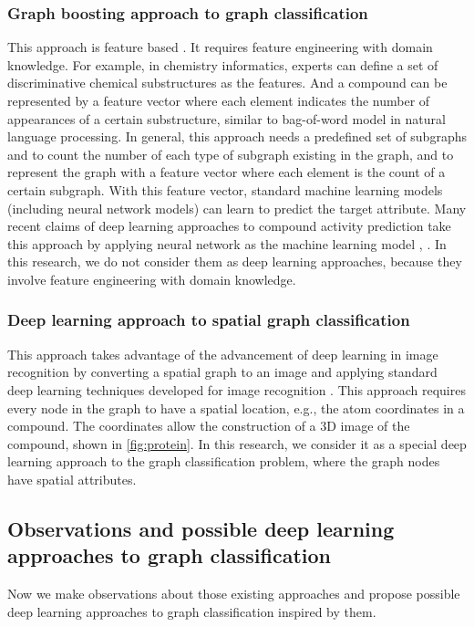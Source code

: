 \documentclass{article}
\begin{document}
\subsubsection{Graph boosting approach to graph classification}
This approach is feature based \cite{saigo2009gboost}.
It requires feature engineering with domain knowledge.
For example, in chemistry informatics, experts can define a set of discriminative chemical substructures as the features.
And a compound can be represented by a feature vector where each element indicates
the number of appearances of a certain substructure,
similar to bag-of-word model in natural language processing.
In general, this approach needs a predefined set of subgraphs and
to count the number of each type of subgraph existing in the graph, and
to represent the graph with a feature vector where each element is the count of a certain subgraph.
With this feature vector, standard machine learning models (including neural network models) can learn to predict the target attribute.
Many recent claims of deep learning approaches to compound activity prediction
take this approach by applying neural network as the machine learning model
\cite{unterthiner2015toxicity}, \cite{unterthiner2014deep} \cite{ramsundar2015massively}.
In this research, we do not consider them as deep learning approaches,
because they involve feature engineering with domain knowledge.

\subsubsection{Deep learning approach to spatial graph classification}
This approach takes advantage of the advancement of deep learning in image recognition by converting a spatial graph to an image and
applying standard deep learning techniques developed for image recognition \cite{wallach2015atomnet}.
This approach requires every node in the graph to have a spatial location,
 e.g., the atom coordinates in a compound.
The coordinates allow the construction of a 3D image of the compound,
shown in \autoref{fig:protein}.
In this research, we consider it as a special deep learning approach to
the graph classification problem, where the graph nodes have spatial attributes.

\subsection{Observations and possible deep learning approaches to graph classification}
Now we make observations about those existing approaches and
propose possible deep learning approaches to graph classification inspired by them.
\end{document}
